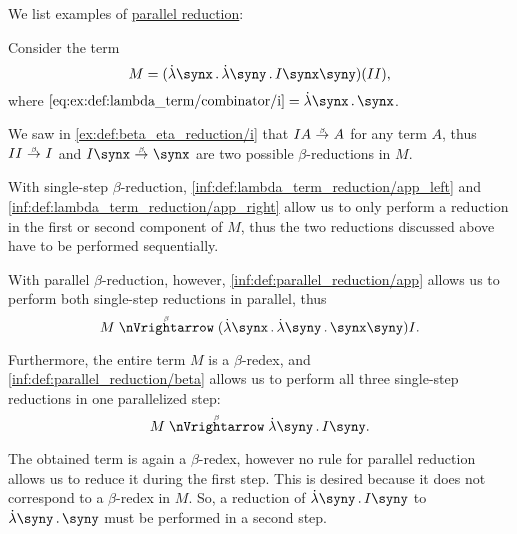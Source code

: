 \begin{example}\label{ex:def:parallel_reduction}
  We list examples of \hyperref[def:parallel_reduction]{parallel reduction}:
  \begin{thmenum}
     Consider the term
    \begin{equation*}
      M = (\qabs \synx \qabs \syny I \synx \syny)(I I),
    \end{equation*}
    where \( \ref{eq:ex:def:lambda_term/combinator/i} = \qabs \synx \synx \).

    We saw in \cref{ex:def:beta_eta_reduction/i} that \( I A \bred A \) for any term \( A \), thus \( I I \bred I \) and \( I \synx \bred \synx \) are two possible \( \beta \)-reductions in \( M \).

    With single-step \( \beta \)-reduction, \ref{inf:def:lambda_term_reduction/app_left} and \ref{inf:def:lambda_term_reduction/app_right} allow us to only perform a reduction in the first or second component of \( M \), thus the two reductions discussed above have to be performed sequentially.

    With parallel \( \beta \)-reduction, however, \ref{inf:def:parallel_reduction/app} allows us to perform both single-step reductions in parallel, thus
    \begin{equation*}
      M \pbred (\qabs \synx \qabs \syny \synx \syny) I.
    \end{equation*}

    Furthermore, the entire term \( M \) is a \( \beta \)-redex, and \ref{inf:def:parallel_reduction/beta} allows us to perform all three single-step reductions in one parallelized step:
    \begin{equation*}
      M \pbred \qabs \syny I \syny.
    \end{equation*}

    The obtained term is again a \( \beta \)-redex, however no rule for parallel reduction allows us to reduce it during the first step. This is desired because it does not correspond to a \( \beta \)-redex in \( M \). So, a reduction of \( \qabs \syny I \syny \) to \( \qabs \syny \syny \) must be performed in a second step.
  \end{thmenum}
\end{example}

